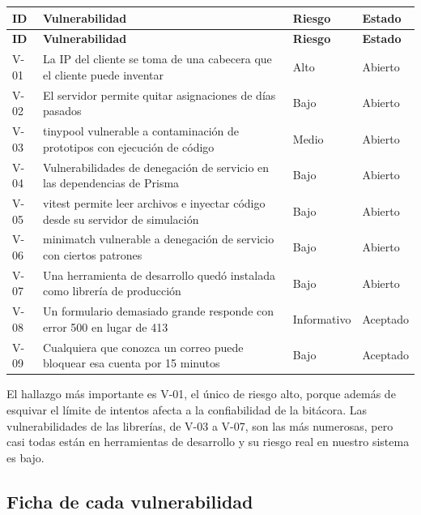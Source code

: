 \documentclass[12pt, letterpaper]{article}
\begin{document}
\begingroup\small\setlength{\tabcolsep}{4pt}\renewcommand{\arraystretch}{1.25}
\begin{longtable}{L{0.08}L{0.60}L{0.13}L{0.12}}
\toprule
\textbf{ID} & \textbf{Vulnerabilidad} & \textbf{Riesgo} & \textbf{Estado} \\
\midrule
\endfirsthead
\toprule
\textbf{ID} & \textbf{Vulnerabilidad} & \textbf{Riesgo} & \textbf{Estado} \\
\midrule
\endhead
\bottomrule
\endfoot
V-01 & La IP del cliente se toma de una cabecera que el cliente puede inventar & Alto & Abierto \\
V-02 & El servidor permite quitar asignaciones de días pasados & Bajo & Abierto \\
V-03 & tinypool vulnerable a contaminación de prototipos con ejecución de código & Medio & Abierto \\
V-04 & Vulnerabilidades de denegación de servicio en las dependencias de Prisma & Bajo & Abierto \\
V-05 & vitest permite leer archivos e inyectar código desde su servidor de simulación & Bajo & Abierto \\
V-06 & minimatch vulnerable a denegación de servicio con ciertos patrones & Bajo & Abierto \\
V-07 & Una herramienta de desarrollo quedó instalada como librería de producción & Bajo & Abierto \\
V-08 & Un formulario demasiado grande responde con error 500 en lugar de 413 & Informativo & Aceptado \\
V-09 & Cualquiera que conozca un correo puede bloquear esa cuenta por 15 minutos & Bajo & Aceptado \\
\end{longtable}
\endgroup

El hallazgo más importante es V-01, el único de riesgo alto, porque además de esquivar el límite de intentos afecta a la confiabilidad de la bitácora. Las vulnerabilidades de las librerías, de V-03 a V-07, son las más numerosas, pero casi todas están en herramientas de desarrollo y su riesgo real en nuestro sistema es bajo.

\subsection{Ficha de cada vulnerabilidad}
\end{document}
